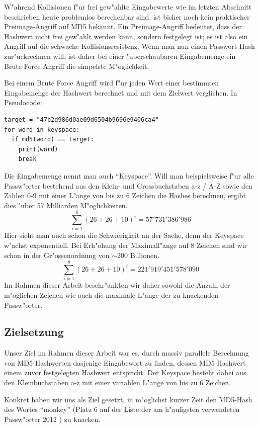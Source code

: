 \begin{refsection}
W"ahrend Kollisionen f"ur frei gew"ahlte Eingabewerte wie im letzten Abschnitt
beschrieben heute problemlos berechenbar sind, ist bisher noch kein praktischer
Preimage-Angriff auf MD5 bekannt. Ein Preimage-Angriff bedeutet, dass der
Hashwert nicht frei gew"ahlt werden kann, sondern festgelegt ist; es ist also
ein Angriff auf die schwache Kollisionsresistenz. Wenn man nun einen
Passwort-Hash zur"uckrechnen will, ist daher bei einer "uberschaubaren
Eingabemenge ein Brute-Force Angriff die simpelste M"oglichkeit.

Bei einem Brute Force Angriff wird f"ur jeden Wert einer bestimmten
Eingabemenge der Hash\-wert berechnet und mit dem Zielwert verglichen. In
Pseudocode:

\begin{verbatim}
target = "47b2d986d0ae09d6504b9696e9406ca4"
for word in keyspace:
  if md5(word) == target:
    print(word)
    break
\end{verbatim}

\label{crypto:keyspace}
Die Eingabemenge nennt man auch ``Keyspace''. Will man beispielsweise f"ur alle
Passw"orter bestehend aus den Klein- und Grossbuchstaben a-z / A-Z sowie den
Zahlen 0-9 mit einer L"ange von bis zu 6 Zeichen die Hashes berechnen, ergibt
dies "uber 57 Milliarden M"oglichkeiten.
\[
	\sum_{i=1}^{6} \left(26 + 26 + 10\right)^i = 57'731'386'986
\]
Hier sieht man auch schon die Schwierigkeit an der Sache, denn der Keyspace
w"achst exponentiell. Bei Erh"ohung der Maximall"ange auf 8 Zeichen sind wir schon
in der Gr"ossenordnung von $\sim$200 Billionen.
\[
	\sum_{i=1}^{8} \left(26 + 26 + 10\right)^i = 221'919'451'578'090
\]
Im Rahmen dieser Arbeit beschr"ankten wir daher sowohl die Anzahl der m"oglichen
Zeichen wie auch die maximale L"ange der zu knackenden Passw"orter.


\subsection{Zielsetzung}
\label{crypto:zielsetzung}

Unser Ziel im Rahmen dieser Arbeit war es, durch massiv parallele Berechnung von
MD5-Hashwerten dasjenige Eingabewort zu finden, dessen MD5-Hashwert einem zuvor
festgelegten Hashwert entspricht. Der Keyspace besteht dabei aus den
Kleinbuchstaben a-z mit einer variablen L"ange von bis zu 6 Zeichen.

Konkret haben wir uns als Ziel gesetzt, in m"oglichst kurzer Zeit den MD5-Hash
des Wortes ``monkey'' (Platz 6 auf der Liste der am h"aufigsten verwendeten
Passw"orter 2012 \cite{crypto:splash2012}) zu knacken.


\end{refsection}
